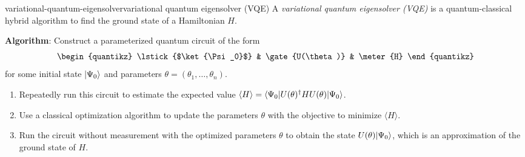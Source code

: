 \begin{topic}{variational-quantum-eigensolver}{variational quantum eigensolver (VQE)}
    A \emph{variational quantum eigensolver (VQE)} is a quantum-classical hybrid algorithm to find the ground state of a Hamiltonian $H$.

    \textbf{Algorithm}: Construct a parameterized quantum circuit of the form
    \[ \svg \begin{quantikz}
        \lstick{$\ket{\Psi_0}$} & \gate{U(\theta)} & \meter{H}
    \end{quantikz} \]
    for some initial state $|\Psi_0\rangle$ and parameters $\theta = (\theta_1, \ldots, \theta_n)$.
    \begin{enumerate}[label=(\arabic*)]
        \item Repeatedly run this circuit to estimate the expected value $\langle H \rangle = \langle\Psi_0| U(\theta)^\dag H U(\theta) |\Psi_0\rangle$.
        \item Use a classical optimization algorithm to update the parameters $\theta$ with the objective to minimize $\langle H \rangle$.
        \item Run the circuit without measurement with the optimized parameters $\theta$ to obtain the state $U(\theta) |\Psi_0\rangle$, which is an approximation of the ground state of $H$.
    \end{enumerate}
\end{topic}

